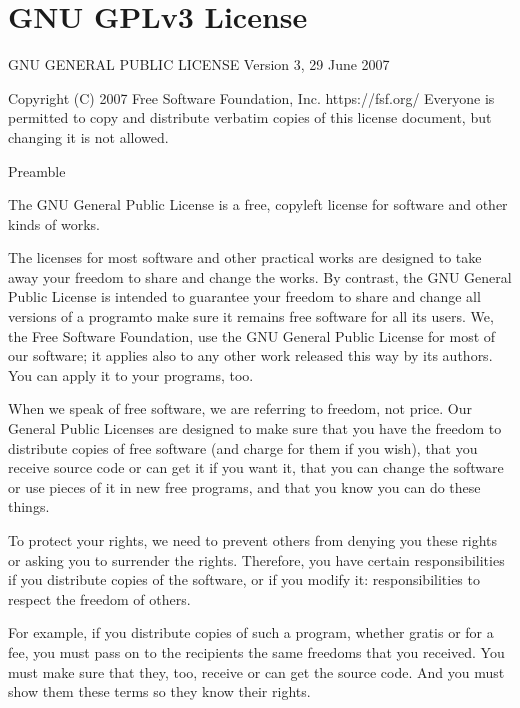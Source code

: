 \documentclass[letterpaper,10pt,english]{sphinxmanual}
\begin{document}
\section{GNU GPLv3 License}
\label{\detokenize{LICENSE:gnu-gplv3-license}}\label{\detokenize{LICENSE:gnulicense}}
\begin{sphinxVerbatim}[commandchars=\\\{\}]
                    GNU GENERAL PUBLIC LICENSE
                       Version 3, 29 June 2007

 Copyright (C) 2007 Free Software Foundation, Inc. \PYGZlt{}https://fsf.org/\PYGZgt{}
 Everyone is permitted to copy and distribute verbatim copies
 of this license document, but changing it is not allowed.

                            Preamble

  The GNU General Public License is a free, copyleft license for
software and other kinds of works.

  The licenses for most software and other practical works are designed
to take away your freedom to share and change the works.  By contrast,
the GNU General Public License is intended to guarantee your freedom to
share and change all versions of a program\PYGZhy{}\PYGZhy{}to make sure it remains free
software for all its users.  We, the Free Software Foundation, use the
GNU General Public License for most of our software; it applies also to
any other work released this way by its authors.  You can apply it to
your programs, too.

  When we speak of free software, we are referring to freedom, not
price.  Our General Public Licenses are designed to make sure that you
have the freedom to distribute copies of free software (and charge for
them if you wish), that you receive source code or can get it if you
want it, that you can change the software or use pieces of it in new
free programs, and that you know you can do these things.

  To protect your rights, we need to prevent others from denying you
these rights or asking you to surrender the rights.  Therefore, you have
certain responsibilities if you distribute copies of the software, or if
you modify it: responsibilities to respect the freedom of others.

  For example, if you distribute copies of such a program, whether
gratis or for a fee, you must pass on to the recipients the same
freedoms that you received.  You must make sure that they, too, receive
or can get the source code.  And you must show them these terms so they
know their rights.


\end{sphinxVerbatim}
\end{document}
